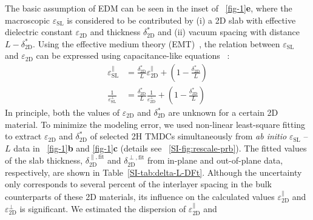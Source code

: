 The basic assumption of EDM can be
seen in the inset of ~\autoref{fig-1}\textbf{e}, where the macroscopic
$\varepsilon_{\mathrm{SL}}$ is considered to be contributed by (i) a
2D slab with effective dielectric constant $\varepsilon_{\mathrm{2D}}$
and thickness $\delta^{*}_{\mathrm{2D}}$ and (ii) vacuum spacing with
distance $L-\delta^{*}_{\mathrm{2D}}$. Using the effective medium theory
(EMT)~\cite{Aspnes_1982_EMT,Markel_2016_EMT}, the relation between
$\varepsilon_{\mathrm{SL}}$ and $\varepsilon_{\mathrm{2D}}$ can be
expressed using capacitance-like
equations~\cite{Matthes_2016_effective_PRB,Laturia_2018_2D_eps} :
\begin{subequations}
  \begin{eqnarray}
    \label{eq:diele-emt-1}
    {\displaystyle \varepsilon_{\mathrm{SL}}^{\parallel}} &= {\displaystyle \frac{\delta^{*}_{\mathrm{2D}}}{L} \varepsilon_{\mathrm{2D}}^{\parallel} + \left(1 - \frac{\delta^{*}_{\mathrm{2D}}}{L} \right)}\\
     \label{eq:diele-emt-2}
    {\displaystyle \frac{1}{\varepsilon_{\mathrm{SL}}^{\perp}}} &= {\displaystyle \frac{\delta^{*}_{\mathrm{2D}}}{L} \frac{1}{\varepsilon_{\mathrm{2D}}^{\perp}} + \left(1 - \frac{\delta^{*}_{\mathrm{2D}}}{L} \right)}
  \end{eqnarray}
\end{subequations}
In principle, both the values of $\varepsilon_{\mathrm{2D}}$ and
$\delta^{*}_{\mathrm{2D}}$ are unknown for a certain 2D material. To
minimize the modeling error, we used non-linear least-square fitting
to extract $\varepsilon_{\mathrm{2D}}$ and $\delta^{*}_{\mathrm{2D}}$ of
selected 2H TMDCs simultaneously from \textit{ab initio}
$\varepsilon_{\mathrm{SL}}$ -- $L$ data in
~\autoref{fig-1}\textbf{b} and \autoref{fig-1}\textbf{c} (details see
 ~\autoref{SI-fig:rescale-prb}). The fitted values of
the slab thickness, $\delta_{\mathrm{2D}}^{\parallel, \mathrm{fit}}$
and $\delta_{\mathrm{2D}}^{\perp, \mathrm{fit}}$ from in-plane and
out-of-plane data, respectively, are shown in 
Table~\autoref{SI-tab:delta-L-DFt}.
%
%
Although the uncertainty only corresponds to several percent of the
interlayer spacing in the bulk counterparts of these 2D materials, its
influence on the calculated values
$\varepsilon_{\mathrm{2D}}^{\parallel}$ and
$\varepsilon_{\mathrm{2D}}^{\perp}$ is significant. We estimated the
dispersion of $\varepsilon_{\mathrm{2D}}^{\parallel}$ and
